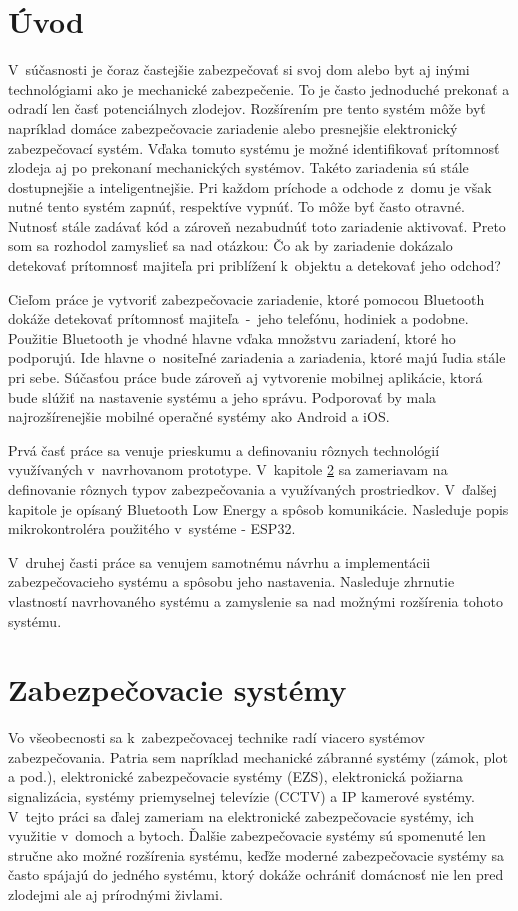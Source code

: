 \chapter{Úvod}

V~súčasnosti je čoraz častejšie zabezpečovať si svoj dom alebo byt aj inými technológiami ako je mechanické zabezpečenie. To je často jednoduché prekonať a odradí len časť potenciálnych zlodejov. Rozšírením pre tento systém môže byť napríklad domáce zabezpečovacie zariadenie alebo presnejšie elektronický zabezpečovací systém. Vďaka tomuto systému je možné identifikovať prítomnosť zlodeja aj po prekonaní mechanických systémov. Takéto zariadenia sú stále dostupnejšie a inteligentnejšie. Pri každom príchode a odchode z~domu je však nutné tento systém zapnúť, respektíve vypnúť. To môže byť často otravné. Nutnosť stále zadávať kód a zároveň nezabudnúť toto zariadenie aktivovať. Preto som sa rozhodol zamyslieť sa nad otázkou: Čo ak by zariadenie dokázalo detekovať prítomnosť majiteľa pri priblížení k~objektu a detekovať jeho odchod?

Cieľom práce je vytvoriť zabezpečovacie zariadenie, ktoré pomocou Bluetooth dokáže detekovať prítomnosť majiteľa~-~jeho telefónu, hodiniek a podobne. Použitie Bluetooth je vhodné hlavne vďaka množstvu zariadení, ktoré ho podporujú. Ide hlavne o~nositeľné zariadenia a zariadenia, ktoré majú ľudia stále pri sebe.
Súčasťou práce bude zároveň aj vytvorenie mobilnej aplikácie, ktorá bude slúžiť na nastavenie systému a jeho správu. Podporovať by mala najrozšírenejšie mobilné operačné systémy ako Android a iOS.

Prvá časť práce sa venuje prieskumu a definovaniu rôznych technológií využívaných v~navrhovanom prototype. V~kapitole \ref{chap:ZS} sa zameriavam na definovanie rôznych typov zabezpečovania a využívaných prostriedkov. V~ďalšej kapitole je opísaný Bluetooth Low Energy a spôsob komunikácie. Nasleduje popis mikrokontroléra použitého v~systéme - ESP32.

V~druhej časti práce sa venujem samotnému návrhu a implementácii zabezpečovacieho systému a spôsobu jeho nastavenia. Nasleduje zhrnutie vlastností navrhovaného systému a zamyslenie sa nad možnými rozšírenia tohoto systému.

\chapter{Zabezpečovacie systémy}\label{chap:ZS}

Vo všeobecnosti sa k~zabezpečovacej technike radí viacero systémov zabezpečovania. Patria sem napríklad mechanické zábranné systémy (zámok, plot a pod.), elektronické zabezpečovacie systémy (EZS), elektronická požiarna signalizácia, systémy priemyselnej televízie (CCTV) a IP kamerové systémy. V~tejto práci sa ďalej zameriam na elektronické zabezpečovacie systémy, ich využitie v~domoch a bytoch. Ďalšie zabezpečovacie systémy sú spomenuté len stručne ako možné rozšírenia systému, keďže moderné zabezpečovacie systémy sa často spájajú do jedného systému, ktorý dokáže ochrániť domácnosť nie len pred zlodejmi ale aj prírodnými živlami.

